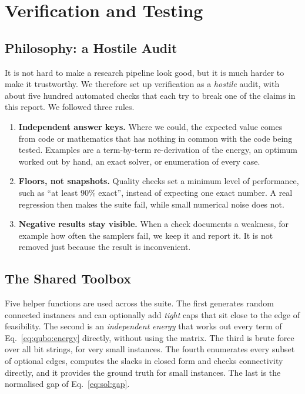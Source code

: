 \chapter{Verification and Testing}
\label{ch:verify}

\section{Philosophy: a Hostile Audit}

It is not hard to make a research pipeline look good, but it is much harder
to make it trustworthy. We therefore set up verification as a \emph{hostile}
audit, with about five hundred automated checks that each try to break one of
the claims in this report. We followed three rules.

\begin{enumerate}[label=\arabic*.]
\item \textbf{Independent answer keys.} Where we could, the expected value
comes from code or mathematics that has nothing in common with the code being
tested. Examples are a term-by-term re-derivation of the energy, an optimum
worked out by hand, an exact solver, or enumeration of every case.
\item \textbf{Floors, not snapshots.} Quality checks set a minimum level of
performance, such as ``at least 90\% exact'', instead of expecting one exact
number. A real regression then makes the suite fail, while small numerical
noise does not.
\item \textbf{Negative results stay visible.} When a check documents a
weakness, for example how often the samplers fail, we keep it and report it.
It is not removed just because the result is inconvenient.
\end{enumerate}

\section{The Shared Toolbox}

Five helper functions are used across the suite. The first generates random
connected instances and can optionally add \emph{tight} caps that sit close to
the edge of feasibility. The second is an \emph{independent energy} that works
out every term of Eq.~\eqref{eq:qubo:energy} directly, without using the
matrix. The third is brute force over all bit strings, for very small
instances. The fourth enumerates every subset of optional edges, computes the
slacks in closed form and checks connectivity directly, and it provides the
ground truth for small instances. The last is the normalised gap of
Eq.~\eqref{eq:sol:gap}.

